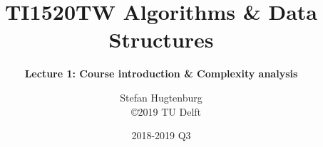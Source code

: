 

\title[Algorithms \& Data Structures]{TI1520TW Algorithms \& Data Structures}
\subtitle{\color{cyan} \textbf{Lecture 1: Course introduction \& Complexity analysis}}
\author{Stefan Hugtenburg\\ {\tiny{\qquad~~\copyright 2019 TU Delft}}}
\date{2018-2019 Q3}



\frame{\titlepage}








\frame{\titlepage}


